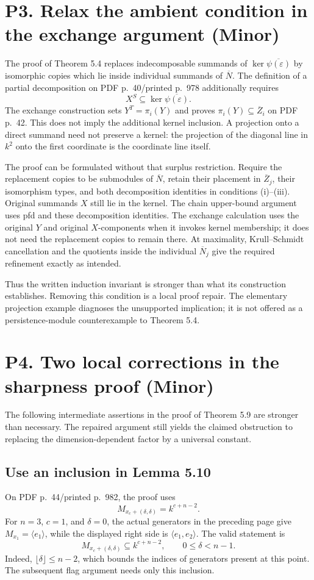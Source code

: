 \documentclass[10pt]{article}
\begin{document}
\section*{P3. Relax the ambient condition in the exchange argument (Minor)}
The proof of Theorem 5.4 replaces indecomposable summands of \(\ker\overline{\psi(\varepsilon)}\) by isomorphic copies which lie inside individual summands of \(\overline N\). The definition of a partial decomposition on PDF p. 40/printed p. 978 additionally requires \[X^S\subseteq\ker\overline{\psi(\varepsilon)}.\] The exchange construction sets \(Y^T=\pi_i(Y)\) and proves \(\pi_i(Y)\subseteq\overline Z_i\) on PDF p. 42. This does not imply the additional kernel inclusion. A projection onto a direct summand need not preserve a kernel: the projection of the diagonal line in \(k^2\) onto the first coordinate is the coordinate line itself.\par
The proof can be formulated without that surplus restriction. Require the replacement copies to be submodules of \(\overline N\), retain their placement in \(\overline Z_j\), their isomorphism types, and both decomposition identities in conditions (i)–(iii). Original summands \(X\) still lie in the kernel. The chain upper-bound argument uses pfd and these decomposition identities. The exchange calculation uses the original \(Y\) and original \(X\)-components when it invokes kernel membership; it does not need the replacement copies to remain there. At maximality, Krull–Schmidt cancellation and the quotients inside the individual \(\overline N_j\) give the required refinement exactly as intended.\par
Thus the written induction invariant is stronger than what its construction establishes. Removing this condition is a local proof repair. The elementary projection example diagnoses the unsupported implication; it is not offered as a persistence-module counterexample to Theorem 5.4.\par
\section*{P4. Two local corrections in the sharpness proof (Minor)}
The following intermediate assertions in the proof of Theorem 5.9 are stronger than necessary. The repaired argument still yields the claimed obstruction to replacing the dimension-dependent factor by a universal constant.\par
\subsection*{Use an inclusion in Lemma 5.10}
On PDF p. 44/printed p. 982, the proof uses \[M_{x_c+(\delta,\delta)}=k^{c+n-2}.\] For \(n=3\), \(c=1\), and \(\delta=0\), the actual generators in the preceding page give \(M_{x_1}=\langle e_1\rangle\), while the displayed right side is \(\langle e_1,e_2\rangle\). The valid statement is \[M_{x_c+(\delta,\delta)}\subseteq k^{c+n-2},
 \qquad 0\leq\delta<n-1.\] Indeed, \(\lfloor\delta\rfloor\leq n-2\), which bounds the indices of generators present at this point. The subsequent flag argument needs only this inclusion.\par
\end{document}
